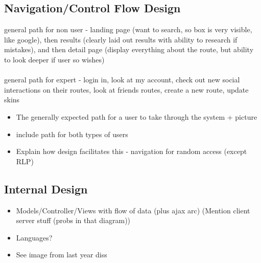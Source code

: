 \subsection{Navigation/Control Flow Design}
{\color{blue}
general path for non user - landing page (want to search, so box is very visible, like google), then results (clearly laid out results with ability to research if mistakes), and then detail page (display everything about the route, but ability to look deeper if user so wishes)\ \\
\ \\
general path for expert - login in, look at my account, check out new social interactions on their routes, look at friends routes, create a new route, update skins
}
{\color{red}
	\begin{itemize}
		\item The generally expected path for a user to take through the system + picture
		\item include path for both types of users
		\item Explain how design facilitates this - navigation for random access (except RLP)
	\end{itemize}
}

\subsection{Internal Design}
{\color{red}
	\begin{itemize}
		\item Models/Controller/Views with flow of data (plus ajax arc) (Mention client server stuff (probs in that diagram))
		\item Languages?
		\item See image from last year diss
	\end{itemize}
}


